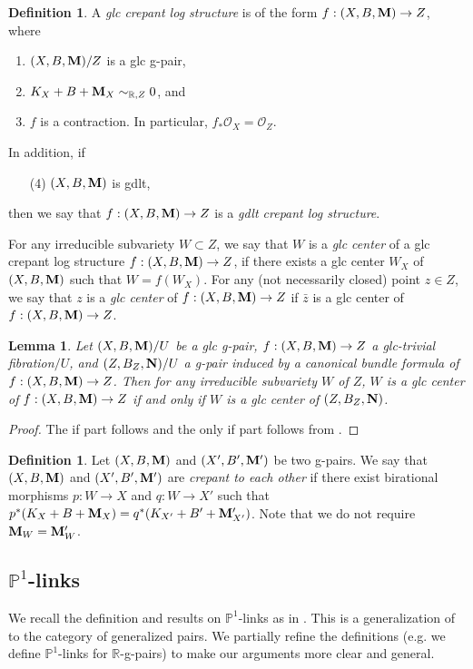\documentclass[11pt]{amsart}
\numberwithin{equation}{section}
\newcommand{\Mm}{{\bf{M}}}
\newcommand{\NN}{{\bf{N}}}
\newcommand{\Rr}{\mathbb{R}}
\newcommand{\Oo}{\mathcal{O}}
\newtheorem{lem}[thm]{Lemma}
\theoremstyle{definition}
\newtheorem{defn}[thm]{Definition}
\theoremstyle{definition}
\theoremstyle{definition}
\begin{document}
\begin{defn}
A \emph{glc crepant log structure} is of the form $f: (X,B,\Mm)\rightarrow Z$, where
\begin{enumerate}
    \item $(X,B,\Mm)/Z$ is a glc g-pair,
    \item $K_X+B+\Mm_X\sim_{\Rr,Z}0$, and
    \item $f$ is a contraction. In particular, $f_*\Oo_X=\Oo_Z$.
\end{enumerate}
In addition, if
\begin{enumerate}
    \item[(4)] $(X,B,\Mm)$ is gdlt, 
\end{enumerate}
then we say that $f: (X,B,\Mm)\rightarrow Z$ is a \emph{gdlt crepant log structure}.

For any irreducible subvariety $W\subset Z$, we say that $W$ is a \emph{glc center} of a glc crepant log structure $f: (X,B,\Mm)\rightarrow Z$, if there exists a glc center $W_X$ of $(X,B,\Mm)$ such that $W=f(W_X)$. For any (not necessarily closed) point $z\in Z$, we say that $z$ is a \emph{glc center} of $f: (X,B,\Mm)\rightarrow Z$ if $\bar z$ is a glc center of $f: (X,B,\Mm)\rightarrow Z$.
\end{defn}



\begin{lem}\label{lem: glc centers come from cbf}
Let $(X,B,\Mm)/U$ be a glc g-pair, $f: (X,B,\Mm)\rightarrow Z$ a glc-trivial fibration$/U$, and $(Z,B_Z,\NN)/U$ a g-pair induced by a canonical bundle formula of $f: (X,B,\Mm)\rightarrow Z$. Then for any irreducible subvariety $W$ of $Z$, $W$ is a glc center of $f: (X,B,\Mm)\rightarrow Z$ if and only if $W$ is a glc center of $(Z,B_Z,\NN)$.
\end{lem}
\begin{proof}
The if part follows \cite[Theorem 2.23]{JLX22}  and the only if part follows from \cite[Theorem 2.16(2)]{LX22}.
\end{proof}

\begin{defn}
Let $(X,B,\Mm)$ and $(X',B',\Mm')$ be two g-pairs. We say that  $(X,B,\Mm)$ and $(X',B',\Mm')$ are \emph{crepant to each other} if there exist birational morphisms $p: W\rightarrow X$ and $q: W\rightarrow X'$ such that $p^*(K_X+B+\Mm_X)=q^*(K_{X'}+B'+\Mm'_{X'})$. Note that we do not require $\Mm_W=\Mm'_W$.
\end{defn}


\subsection{\texorpdfstring{$\mathbb P^1$}{}-links}
We recall the definition and results on $\mathbb P^1$-links as in \cite{FS20}. This is a generalization of \cite[Theorem 4.40]{Kol13} to the category of generalized pairs. We partially refine the definitions (e.g. we define $\mathbb P^1$-links for $\mathbb R$-g-pairs) to make our arguments more clear and general.
\end{document}
